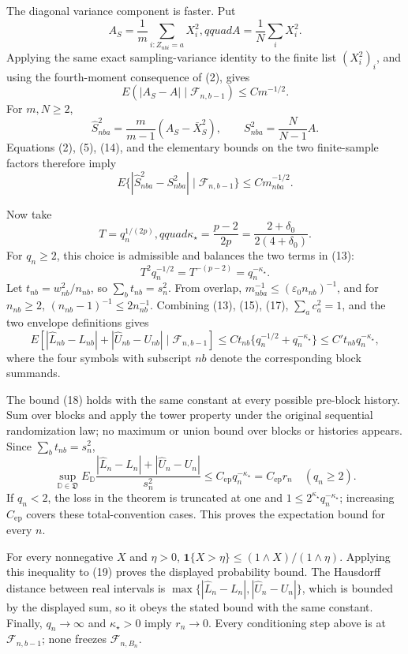The diagonal variance component is faster. Put
\[
A_S=\frac1m\sum_{i:Z_{nbi}=a}X_i^2,qquad A=\frac1N\sum_iX_i^2.
\]
Applying the same exact sampling-variance identity to the finite list \((X_i^2)_i\), and using the fourth-moment consequence of (2), gives
\[
E(|A_S-A|\mid\mathcal F_{n,b-1})\le Cm^{-1/2}.
\tag{14}
\]
For \(m,N\ge2\),
\[
\widehat S_{nba}^2=\frac m{m-1}(A_S-\bar X_S^2),
\qquad S_{nba}^2=\frac N{N-1}A.
\]
Equations (2), (5), (14), and the elementary bounds on the two finite-sample factors therefore imply
\[
E\{|\widehat S_{nba}^2-S_{nba}^2|\mid\mathcal F_{n,b-1}\}
\le Cm_{nba}^{-1/2}.
\tag{15}
\]

Now take
\[
T=q_n^{1/(2p)},qquad
\kappa_\star=\frac{p-2}{2p}=\frac{2+\delta_0}{2(4+\delta_0)}.
\tag{16}
\]
For \(q_n\ge2\), this choice is admissible and balances the two terms in (13):
\[
T^2q_n^{-1/2}=T^{-(p-2)}=q_n^{-\kappa_\star}.
\tag{17}
\]
Let \(t_{nb}=w_{nb}^2/n_{nb}\), so \(\sum_bt_{nb}=s_n^2\). From overlap,
\(m_{nba}^{-1}\le(\varepsilon_0n_{nb})^{-1}\), and for \(n_{nb}\ge2\),
\((n_{nb}-1)^{-1}\le2n_{nb}^{-1}\). Combining (13), (15), (17), \(\sum_ac_a^2=1\), and the two envelope definitions gives
\[
E\left[|\widehat L_{nb}-L_{nb}|+|\widehat U_{nb}-U_{nb}|
\mid\mathcal F_{n,b-1}\right]
\le Ct_{nb}\{q_n^{-1/2}+q_n^{-\kappa_\star}\}
\le C't_{nb}q_n^{-\kappa_\star},
\tag{18}
\]
where the four symbols with subscript \(nb\) denote the corresponding block summands.

The bound (18) holds with the same constant at every possible pre-block history. Sum over blocks and apply the tower property under the original sequential randomization law; no maximum or union bound over blocks or histories appears. Since \(\sum_bt_{nb}=s_n^2\),
\[
\sup_{\mathbb D\in\mathfrak D}E_{\mathbb D}
\frac{|\widehat L_n-L_n|+|\widehat U_n-U_n|}{s_n^2}
\le C_{\mathrm{ep}}q_n^{-\kappa_\star}
=C_{\mathrm{ep}}r_n
\quad(q_n\ge2).
\tag{19}
\]
If \(q_n<2\), the loss in the theorem is truncated at one and
\(1\le2^{\kappa_\star}q_n^{-\kappa_\star}\); increasing \(C_{\mathrm{ep}}\) covers these total-convention cases. This proves the expectation bound for every \(n\).

For every nonnegative \(X\) and \(\eta>0\),
\(\mathbf1\{X>\eta\}\le(1\wedge X)/(1\wedge\eta)\). Applying this inequality to (19) proves the displayed probability bound. The Hausdorff distance between real intervals is
\(\max\{|\widehat L_n-L_n|,|\widehat U_n-U_n|\}\), which is bounded by the displayed sum, so it obeys the stated bound with the same constant. Finally, \(q_n\to\infty\) and \(\kappa_\star>0\) imply \(r_n\to0\). Every conditioning step above is at \(\mathcal F_{n,b-1}\); none freezes \(\mathcal F_{n,B_n}\).